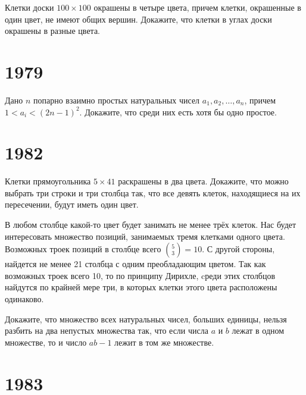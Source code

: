 \documentclass[11pt, a4paper]{problems_template}
\begin{document}
\begin{exercise}[28]
Клетки доски $100 \times 100$ окрашены в четыре цвета, причем клетки, окрашенные в один цвет, не имеют общих вершин. Докажите, что клетки в углах доски окрашены в разные цвета.
\end{exercise}

\chapter{1979}

\begin{exercise}[22]
Дано $n$ попарно взаимно простых натуральных чисел $a_{1}, a_{2}, \dots, a_{n}$, причем $1 < a_{i} < (2n - 1)^{2}$. Докажите, что среди них есть хотя бы одно простое.
\end{exercise}


\chapter{1982}

\begin{exercise}[23]
Клетки прямоугольника $5 \times 41$ раскрашены в два цвета. Докажите, что можно выбрать три строки и три столбца так, что все девять клеток, находящиеся на их пересечении, будут иметь один цвет.
\end{exercise}

\begin{Solution}
В любом столбце какой-то цвет будет занимать не менее трёх клеток. Нас будет интересовать множество позиций, занимаемых тремя клетками одного цвета. Возможных троек позиций в столбце всего $\binom{5}{3} = 10$.
С другой стороны, найдется не менее 21 столбца с одним преобладающим цветом. Так как возможных троек всего 10, то по принципу Дирихле, cреди этих столбцов найдутся по крайней мере три, в которых клетки этого цвета расположены одинаково.
\end{Solution}

\begin{exercise}[44]
Докажите, что множество всех натуральных чисел, больших единицы, нельзя разбить на два непустых множества так, что если числа $a$ и $b$ лежат в одном множестве, то и число $ab - 1$ лежит в том же множестве.
\end{exercise}

\chapter{1983}
\end{document}

